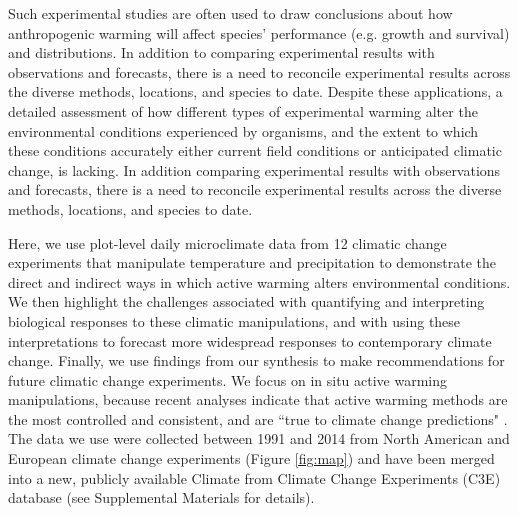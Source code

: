 \documentclass{article}
\begin{document}
\par Such experimental studies are often used to draw conclusions  about how anthropogenic warming  will affect species' performance  (e.g. growth and  survival)  and  distributions\citep{dukes1999,hobbie1999,reich2015,gruner2016}.  %
In addition to comparing experimental results with observations and forecasts, there is a need to reconcile experimental results across the diverse methods, locations, and species to date.%
Despite these applications, a detailed  assessment of how different types of experimental warming alter the environmental conditions experienced by organisms, and the extent to which these conditions accurately either current field conditions or anticipated climatic change, is lacking.  In addition comparing experimental results with observations and forecasts, there is a need to reconcile experimental results across the diverse methods, locations, and species to date. 

\par Here, we use  plot-level daily  microclimate  data  from  12 climatic  change  experiments  that  manipulate temperature and precipitation to demonstrate the direct and indirect ways in which active warming alters environmental conditions. We then highlight the challenges associated with quantifying and interpreting biological responses to these climatic manipulations, and with using these interpretations to forecast  more widespread responses to contemporary climate change. Finally,  we use findings from our synthesis to make recommendations for future  climatic  change experiments.  We focus on in situ active warming  manipulations, because recent analyses indicate that active warming methods are the most controlled and consistent, and are ``true to climate change predictions" \citep{kimball2005,kimball2008,aronson2009,wolkovich2012}. The data we use were collected between 1991 and 2014 from North American and European climate change experiments (Figure \ref{fig:map}) and  have been merged into a new, publicly  available  Climate from Climate Change Experiments (C3E) database (see Supplemental Materials  for details). 
\end{document}
